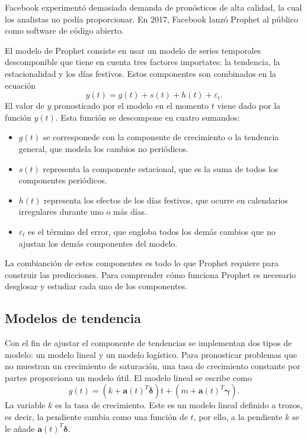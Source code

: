 \documentclass[12pt,twoside]{article}
\begin{document}
Facebook experimentó demasiada demanda de pronósticos de alta calidad, la cual los analistas no podía proporcionar. En 2017, Facebook lanzó Prophet al público como software de código abierto.

El modelo de Prophet consiste en usar un modelo de series temporales descomponible que tiene en cuenta tres factores importates: la tendencia, la estacionalidad y los días festivos. Estos componentes son combinados en la ecuación
\begin{equation}\label{eq:prophet:descom}
    y(t) = g(t) + s(t) + h(t) + \varepsilon_t .
\end{equation}
El valor de $y$ pronosticado por el modelo en el momento $t$ viene dado por la función $y(t)$. Esta función se descompone en cuatro sumandos:
\begin{itemize}
    \item $g(t)$ se corresponede con la componente de crecimiento o la tendencia general, que modela los cambios no periódicos.
    \item $s(t)$ representa la componente estacional, que es la suma de todos los componentes periódicos.
    \item $h(t)$ representa los efectos de los días festivos, que ocurre en calendarios irregulares durante uno o más días.
    \item $\varepsilon_t$ es el término del error, que engloba todos los demás cambios que no ajustan los demás componentes del modelo.
\end{itemize}

La combianción de estos componentes es todo lo que Prophet requiere para construir las predicciones. Para comprender cómo funciona Prophet es necesario desglosar y estudiar cada uno de los componentes.

\subsection{Modelos de tendencia}
Con el fin de ajustar el componente de tendencias se implementan dos tipos de modelo: un modelo lineal y un modelo logístico. Para pronosticar problemas que no muestran un crecimiento de saturación, una tasa de crecimiento constante por partes proporciona un modelo útil. El modelo lineal se escribe como
\begin{equation} \label{eq:prophet:g_lineal}
    g(t) = (k+\mathbf{a}(t)^T \boldsymbol{\delta})t + (m + \mathbf{a}(t)^T\boldsymbol{\gamma}).
\end{equation}
La variable $k$ es la tasa de crecimiento. Este es un modelo lineal definido a trozos, es decir, la pendiente cambia como una función de $t$, por ello, a la pendiente $k$ se le añade $\mathbf{a}(t)^T\boldsymbol{\delta}$.
\end{document}
